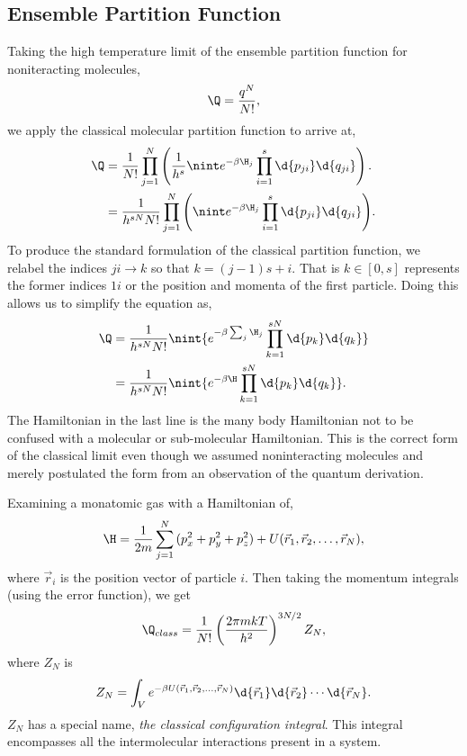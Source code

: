 \subsection{Ensemble Partition Function}
Taking the high temperature limit of the ensemble partition function for
noniteracting molecules,
\begin{equation*}
	\Q = \frac{q^{N}}{N!},
\end{equation*}
we apply the classical molecular partition function to arrive at,
\begin{align*}
	\Q &= \frac{1}{N!}\prod_{j=1}^{N}\left({\frac{1}{h^{s}}\nint
			e^{-\beta\H_{j}} \prod_{i=1}^{s}{\d{p_{ji}}\d{q_{ji}}}}\right).\\
	   &= \frac{1}{h^{sN}N!}\prod_{j=1}^{N}{\left(\nint
	   e^{-\beta\H_{j}} \prod_{i=1}^{s}{\d{p_{ji}}\d{q_{ji}}}\right)}.
\end{align*}
To produce the standard formulation of the classical partition function, we
relabel the indices $ji \to k$ so that $k = (j-1)s + i$. That is $k \in [0,s]$
represents the former indices $1i$ or the position and momenta of the first
particle. Doing this allows us to simplify the equation as,
\begin{align*}
	\Q &= \frac{1}{h^{sN}N!}\nint{e^{-\beta\sum_{j}{\H_{j}}}
	\prod_{k=1}^{sN}{\d{p_{k}}\d{q_{k}}}}\\
	   &= \frac{1}{h^{sN}N!}\nint{e^{-\beta\H}
	\prod_{k=1}^{sN}{\d{p_{k}}\d{q_{k}}}}.
\end{align*}
The Hamiltonian in the last line is the many body Hamiltonian not to be confused
with a molecular or sub-molecular Hamiltonian. This is the correct form of the
classical limit even though we assumed noninteracting molecules and merely
postulated the form from an observation of the quantum derivation.

Examining a monatomic gas with a Hamiltonian of,
\begin{equation*}
	\H = \frac{1}{2m} \sum_{j=1}^{N}{(p_{x}^{2} + p^{2}_y + p^{2}_{z}) +
	U(\vec{r}_{1}, \vec{r}_{2}, \ldots, \vec{r}_N )},
\end{equation*}
where $\vec{r}_i$ is the position vector of particle $i$. Then taking the
momentum integrals (using the error function), we get
\begin{equation*}
	\Q_{class} = \frac{1}{N!}\left(\frac{2\pi m kT}{h^{2}}\right)^{3N/2} Z_{N},
\end{equation*}
where $Z_N$ is 
\begin{equation*}
	Z_N = \int_{V}{e^{-\beta U(\vec{r}_{1}, \vec{r}_{2}, \dots, \vec{r}_N )}
	\d{\vec{r}_{1}}\d{\vec{r}_{2}}\cdots\d{\vec{r}_{N}}}.
\end{equation*}
$Z_N$ has a special name, \textit{the classical configuration integral}. This
integral encompasses all the intermolecular interactions present in a system.

